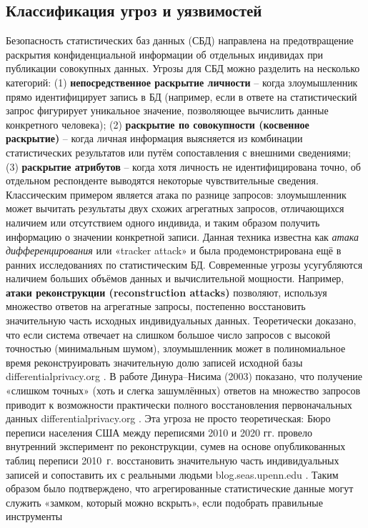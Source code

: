 \subsection{Классификация угроз и уязвимостей}
Безопасность статистических баз данных (СБД) направлена на предотвращение раскрытия конфиденциальной информации об отдельных индивидах при публикации совокупных данных. Угрозы для СБД можно разделить на несколько категорий: (1) \textbf{непосредственное раскрытие личности} – когда злоумышленник прямо идентифицирует запись в БД (например, если в ответе на статистический запрос фигурирует уникальное значение, позволяющее вычислить данные конкретного человека); (2) \textbf{раскрытие по совокупности (косвенное раскрытие)} – когда личная информация выясняется из комбинации статистических результатов или путём сопоставления с внешними сведениями; (3) \textbf{раскрытие атрибутов} – когда хотя личность не идентифицирована точно, об отдельном респонденте выводятся некоторые чувствительные сведения. Классическим примером является атака по разнице запросов: злоумышленник может вычитать результаты двух схожих агрегатных запросов, отличающихся наличием или отсутствием одного индивида, и таким образом получить информацию о значении конкретной записи. Данная техника известна как \textit{атака дифференцирования} или «tracker attack» и была продемонстрирована ещё в ранних исследованиях по статистическим БД. Современные угрозы усугубляются наличием больших объёмов данных и вычислительной мощности. Например, \textbf{атаки реконструкции (reconstruction attacks)} позволяют, используя множество ответов на агрегатные запросы, постепенно восстановить значительную часть исходных индивидуальных данных. Теоретически доказано, что если система отвечает на слишком большое число запросов с высокой точностью (минимальным шумом), злоумышленник может в полиномиальное время реконструировать значительную долю записей исходной базы
differentialprivacy.org
. В работе Динура–Нисима (2003) показано, что получение «слишком точных» (хоть и слегка зашумлённых) ответов на множество запросов приводит к возможности практически полного восстановления первоначальных данных
differentialprivacy.org
. Эта угроза не просто теоретическая: Бюро переписи населения США между переписями 2010 и 2020 гг. провело внутренний эксперимент по реконструкции, сумев на основе опубликованных таблиц переписи 2010~г. восстановить значительную часть индивидуальных записей и сопоставить их с реальными людьми
blog.seas.upenn.edu
. Таким образом было подтверждено, что агрегированные статистические данные могут служить «замком, который можно вскрыть», если подобрать правильные инструменты
